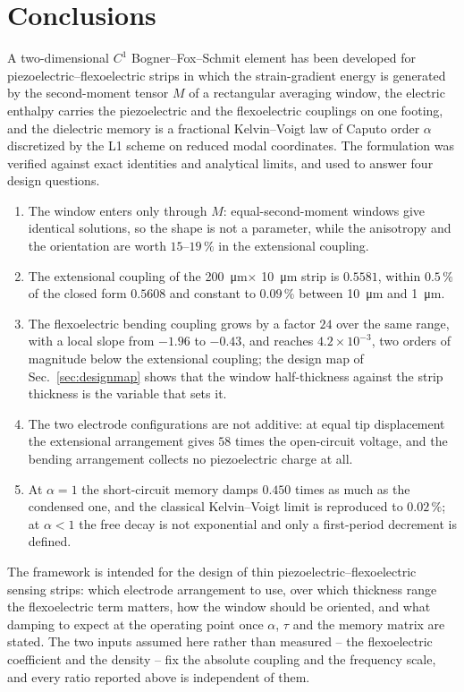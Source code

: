 \FloatBarrier
\section{Conclusions}
\label{sec:conclusions}

A two-dimensional $C^1$ Bogner--Fox--Schmit element has been developed for
piezoelectric--flexoelectric strips in which the strain-gradient energy is
generated by the second-moment tensor $M$ of a rectangular averaging window,
the electric enthalpy carries the piezoelectric and the flexoelectric couplings
on one footing, and the dielectric memory is a fractional Kelvin--Voigt law of
Caputo order $\alpha$ discretized by the L1 scheme on reduced modal
coordinates. The formulation was verified against exact identities and
analytical limits, and used to answer four design questions.

\begin{enumerate}
\item The window enters only through $M$: equal-second-moment windows give
  identical solutions, so the shape is not a parameter, while the anisotropy
  and the orientation are worth $15$--$19\,\%$ in the extensional coupling.
\item The extensional coupling of the \SI{200}{\micro\metre}$\times$
  \SI{10}{\micro\metre} strip is $0.5581$, within $0.5\,\%$ of the closed form
  $0.5608$ and constant to $0.09\,\%$ between \SI{10}{\micro\metre} and
  \SI{1}{\micro\metre}.
\item The flexoelectric bending coupling grows by a factor $24$ over the same
  range, with a local slope from $-1.96$ to $-0.43$, and reaches
  $4.2\times10^{-3}$, two orders of magnitude below the extensional coupling;
  the design map of Sec.~\ref{sec:designmap} shows that the window
  half-thickness against the strip thickness is the variable that sets it.
\item The two electrode configurations are not additive: at equal tip
  displacement the extensional arrangement gives $58$ times the open-circuit
  voltage, and the bending arrangement collects no piezoelectric charge at all.
\item At $\alpha=1$ the short-circuit memory damps $0.450$ times as much as the
  condensed one, and the classical Kelvin--Voigt limit is reproduced to
  $0.02\,\%$; at $\alpha<1$ the free decay is not exponential and only a
  first-period decrement is defined.
\end{enumerate}

The framework is intended for the design of thin piezoelectric--flexoelectric
sensing strips: which electrode arrangement to use, over which thickness range
the flexoelectric term matters, how the window should be oriented, and what
damping to expect at the operating point once $\alpha$, $\tau$ and the memory
matrix are stated. The two inputs assumed here rather than measured -- the
flexoelectric coefficient and the density -- fix the absolute coupling and the
frequency scale, and every ratio reported above is independent of them.

\FloatBarrier
